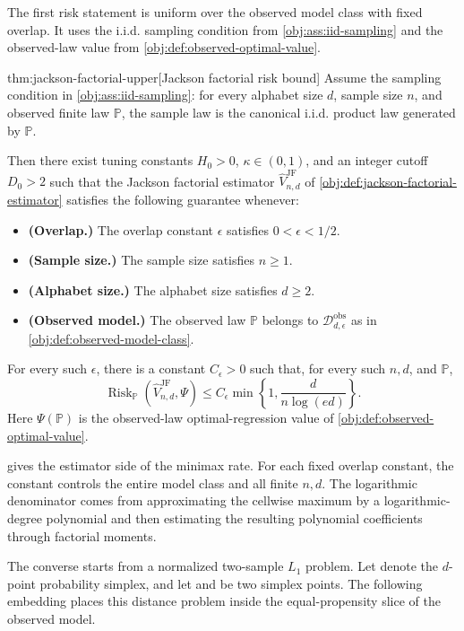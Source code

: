 \documentclass[11pt]{article}
\begin{document}
The first risk statement is uniform over the observed model class with fixed overlap. It uses the i.i.d. sampling condition from \cref{obj:ass:iid-sampling} and the observed-law value from \cref{obj:def:observed-optimal-value}.

\begin{theoremv}{thm:jackson-factorial-upper}[Jackson factorial risk bound]
Assume the sampling condition in \cref{obj:ass:iid-sampling}: for every alphabet size \(d\), sample size \(n\), and observed finite law \(\mathbb P\), the sample law is the canonical i.i.d. product law generated by \(\mathbb P\).

Then there exist tuning constants \(H_0>0\), \(\kappa\in(0,1)\), and an integer cutoff \(D_0>2\) such that the Jackson factorial estimator \(\widehat V_{n,d}^{\mathrm{JF}}\) of \cref{obj:def:jackson-factorial-estimator} satisfies the following guarantee whenever:
\begin{itemize}
\item \textbf{(Overlap.)} The overlap constant \(\epsilon\) satisfies \(0<\epsilon<1/2\).
\item \textbf{(Sample size.)} The sample size satisfies \(n\ge 1\).
\item \textbf{(Alphabet size.)} The alphabet size satisfies \(d\ge 2\).
\item \textbf{(Observed model.)} The observed law \(\mathbb P\) belongs to \(\mathcal D_{d,\epsilon}^{\mathrm{obs}}\) as in \cref{obj:def:observed-model-class}.
\end{itemize}
For every such \(\epsilon\), there is a constant \(C_\epsilon>0\) such that, for every such \(n,d\), and \(\mathbb P\),
\[
\operatorname{Risk}_{\mathbb P}
\left(\widehat V_{n,d}^{\mathrm{JF}},\Psi\right)
\le
C_\epsilon \min\left\{1,\frac{d}{n\log(ed)}\right\}.
\]
Here \(\Psi(\mathbb P)\) is the observed-law optimal-regression value of \cref{obj:def:observed-optimal-value}.
\end{theoremv}

 gives the estimator side of the minimax rate. For each fixed overlap constant, the constant  controls the entire model class and all finite \(n,d\). The logarithmic denominator comes from approximating the cellwise maximum by a logarithmic-degree polynomial and then estimating the resulting polynomial coefficients through factorial moments.

The converse starts from a normalized two-sample \(L_1\) problem. Let  denote the \(d\)-point probability simplex, and let  and  be two simplex points. The following embedding places this distance problem inside the equal-propensity slice of the observed model.
\end{document}
